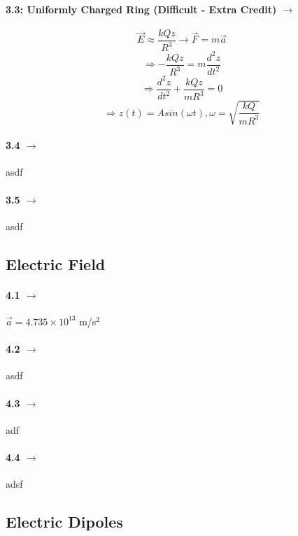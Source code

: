 \documentclass[11pt]{article}
\begin{document}
\paragraph{3.3: Uniformly Charged Ring (Difficult - Extra Credit) $\rightarrow$} 
\begin{equation}
\vec{E} \approx \frac{kQz}{R^3} \rightarrow \vec{F} = m \vec{a}
\end{equation}
\begin{equation}
\Rightarrow -\frac{kQz}{R^3} = m\frac{d^2z}{dt^2} 
\end{equation}
\begin{equation}
\Rightarrow \frac{d^2z}{dt^2} + \frac{kQz}{mR^3} = 0 
\end{equation}
\begin{equation}
\Rightarrow z(t) = Asin(\omega t), \omega = \sqrt{\frac{kQ}{mR^3}}
\end{equation}
\paragraph{3.4 $\rightarrow$}asdf
\paragraph{3.5 $\rightarrow$}asdf
\vspace{15pt}

\subsection*{Electric Field}
\paragraph{4.1 $\rightarrow$} $\vec{a} = 4.735 \times 10^{13}$ m/s$^2$
\paragraph{4.2 $\rightarrow$}asdf
\paragraph{4.3 $\rightarrow$}adf
\paragraph{4.4 $\rightarrow$}adsf
\vspace{15pt}

\subsection*{Electric Dipoles}
\end{document}
